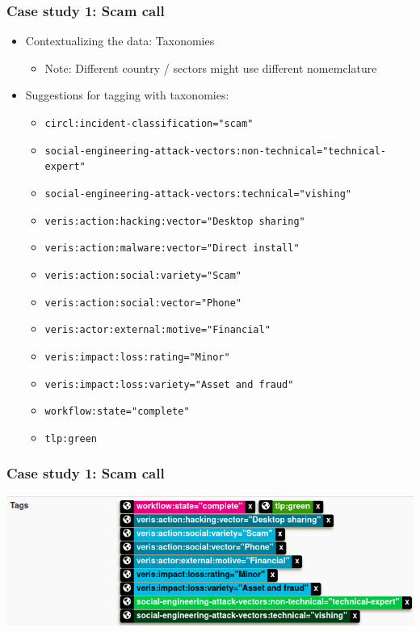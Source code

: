 \begin{frame}
    \frametitle{Case study 1: Scam call}
    \begin{itemize}
        \item Contextualizing the data: Taxonomies
        \begin{itemize}
            \item Note: Different country / sectors might use different nomemclature
        \end{itemize}
        \item Suggestions for tagging with taxonomies:
        \begin{itemize}
            \item \texttt{circl:incident-classification="scam"}
            \item \texttt{\tiny social-engineering-attack-vectors:non-technical="technical-expert"}
            \item \texttt{\tiny social-engineering-attack-vectors:technical="vishing"}
            \item \texttt{veris:action:hacking:vector="Desktop sharing"}
            \item \texttt{veris:action:malware:vector="Direct install"}
            \item \texttt{veris:action:social:variety="Scam"}
            \item \texttt{veris:action:social:vector="Phone"}
            \item \texttt{veris:actor:external:motive="Financial"}
            \item \texttt{veris:impact:loss:rating="Minor"}
            \item \texttt{veris:impact:loss:variety="Asset and fraud"}
            \item \texttt{workflow:state="complete"}
            \item \texttt{tlp:green}
        \end{itemize}
    \end{itemize}
\end{frame}

\begin{frame}
    \frametitle{Case study 1: Scam call}
    \includegraphics[width=1.0\linewidth]{pictures/case1/event-tags.png}
\end{frame}

